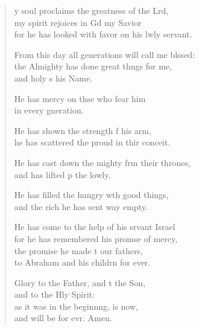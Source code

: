\settowidth{\versewidth}{From this day all generations will call me blessed: +}
\begin{verse}%
  \begin{patverse}
y soul proclaims the greatness of the Lrd,\Flex\\
my spirit rejoices in Gd my Savior\Med\\
for he has looked with favor on his lwly servant.

From this day all generations will call me blssed:\Flex\\
the Almighty has done great th\pointup{\i}ngs for me,\Med\\
and holy \pointup{\i}s his Name.

He has mercy on thse who fear him\Med\\
in every gneration.

He has shown the strength f his arm,\Med\\
he has scattered the proud in thir conceit.

He has cast down the mighty frm their thrones,\Med\\
and has lifted p the lowly.

He has filled the hungry w\pointup{\i}th good things,\Med\\
and the rich he has sent way empty.

He has come to the help of his srvant Israel\Med\\
for he has remembered his prom\pointup{\i}se of mercy,\\
the promise he made t our fathers,\Med\\
to Abraham and his childrn for ever.

Glory to the Father, and t the Son,\Med\\
and to the Hly Spirit:\\
as it was in the beginn\pointup{\i}ng, is now,\Med\\
and will be for evr. Amen.
  \end{patverse}
\end{verse}

